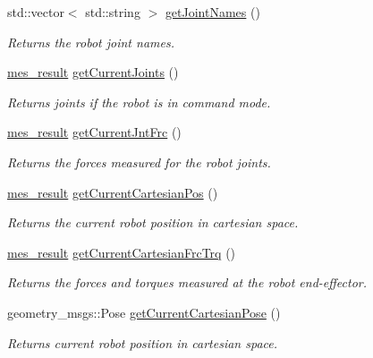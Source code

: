 \begin{DoxyCompactItemize}
\item 
std\-::vector$<$ std\-::string $>$ \hyperlink{classkukadu_1_1PlottingControlQueue_aaf706cd0d7c11787dff3e95a422f38c5}{get\-Joint\-Names} ()
\begin{DoxyCompactList}\small\item\em Returns the robot joint names. \end{DoxyCompactList}\item 
\hyperlink{structmes__result}{mes\-\_\-result} \hyperlink{classkukadu_1_1PlottingControlQueue_ab0cb15c4ab4759bb313ea935149870cf}{get\-Current\-Joints} ()
\begin{DoxyCompactList}\small\item\em Returns joints if the robot is in command mode. \end{DoxyCompactList}\item 
\hyperlink{structmes__result}{mes\-\_\-result} \hyperlink{classkukadu_1_1PlottingControlQueue_a6934e9ae7b6824b0fc01308dccdfd0e8}{get\-Current\-Jnt\-Frc} ()
\begin{DoxyCompactList}\small\item\em Returns the forces measured for the robot joints. \end{DoxyCompactList}\item 
\hyperlink{structmes__result}{mes\-\_\-result} \hyperlink{classkukadu_1_1PlottingControlQueue_a876ce6f03b1ab92384e282a55fd83cf0}{get\-Current\-Cartesian\-Pos} ()
\begin{DoxyCompactList}\small\item\em Returns the current robot position in cartesian space. \end{DoxyCompactList}\item 
\hyperlink{structmes__result}{mes\-\_\-result} \hyperlink{classkukadu_1_1PlottingControlQueue_a86ac37d03a159b54981d40d25486ca26}{get\-Current\-Cartesian\-Frc\-Trq} ()
\begin{DoxyCompactList}\small\item\em Returns the forces and torques measured at the robot end-\/effector. \end{DoxyCompactList}\item 
geometry\-\_\-msgs\-::\-Pose \hyperlink{classkukadu_1_1PlottingControlQueue_ac7f7c811fab06667e75a4da5c8364cc8}{get\-Current\-Cartesian\-Pose} ()
\begin{DoxyCompactList}\small\item\em Returns current robot position in cartesian space. \end{DoxyCompactList}\item 

\end{DoxyCompactItemize}
